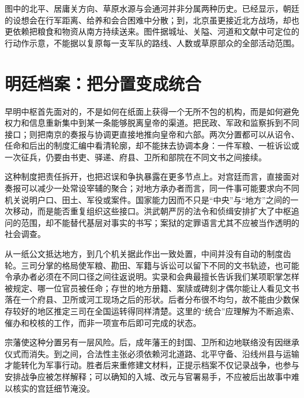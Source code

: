 


图中的北平、居庸关方向、草原水源与会通河并非分属两种历史。已经显示，朝廷的设想会在行军距离、给养和会合困难中分散；到，北京虽更接近北方战场，却也更依赖把粮食和物资从南方持续送来。图件据城址、关隘、河道和文献中可定位的行动作示意，不能据以复原每一支军队的路线、人数或草原部众的全部活动范围。

\section{明廷档案：把分置变成统合}

早明中枢首先面对的，不是如何在纸面上获得一个无所不包的机构，而是如何避免权力和信息重新集中到某一条能够脱离皇帝的渠道。把民政、军政和监察拆到不同接口；则把南京的奏报与协调更直接地推向皇帝和六部。两次分置都可以从诏令、任命和后出的制度汇编中看清轮廓，却不能抹去协调本身：一件军粮、一桩诉讼或一次征兵，仍要由书吏、驿递、府县、卫所和部院在不同文书之间接续。

这种制度把责任拆开，也把迟误和争执暴露在更多节点上。对宫廷而言，直接面对奏报可以减少一处常设宰辅的聚合；对地方承办者而言，同一件事可能要求向不同机关说明户口、田土、军役或案件。国家能力因而不只是“中央”与“地方”之间的一次移动，而是能否重复组织这些接口。洪武朝严厉的法令和侦缉安排扩大了中枢追问的范围，却不能替代基层对事实的书写；案狱的定罪语言尤其不应被当作透明的社会调查。

从一纸公文抵达地方，到几个机关据此作出一致处置，中间并没有自动的制度齿轮。三司分掌的格局使军粮、勘田、军籍与诉讼可以留下不同的文书轨迹，也可能令承办者必须在不同口径之间往返说明。实录和会典最擅长告诉我们某项职掌怎样被规定、哪一位官员被任命；存世的地方册籍、案牍或碑刻才偶尔能让人看见文书落在一个府县、卫所或河工现场之后的形状。后者分布很不均匀，故不能由少数保存较好的地区推定三司在全国运转得同样清楚。这里的“统合”应理解为不断追索、催办和校核的工作，而非一项宣布后即可完成的状态。

宗藩使这种分置另有一层风险。后，成年藩王的封国、卫所和边地联络没有因继承仪式而消失。到之间，合法性主张必须依赖河北道路、北平守备、沿线州县与运输才能转化为军事行动。胜者后来重修建文材料，正提示档案不仅记录战争，也参与安排战争应被怎样解释；可以确知的入城、改元与官署易手，不应被后出故事中难以核实的宫廷细节淹没。

